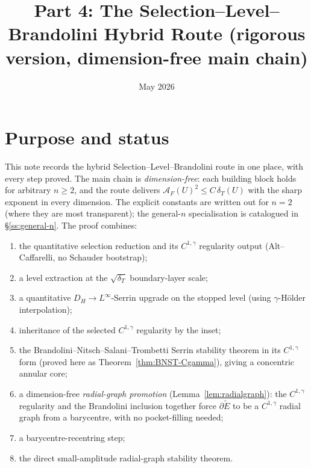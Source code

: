\documentclass[11pt]{amsart}
\title{Part 4: The Selection--Level--Brandolini Hybrid Route
       (rigorous version, dimension-free main chain)}
\author{}
\date{May 2026}
\newcommand{\dT}{\delta_T}
\newcommand{\AF}{\mathcal A_F}
\newcommand{\Etil}{\widetilde E}
\begin{document}
\maketitle

\section{Purpose and status}

This note records the hybrid Selection--Level--Brandolini route in
one place, with every step proved.  The main chain is
\emph{dimension-free}: each building block holds for arbitrary
$n\ge 2$, and the route delivers
$\AF(U)^{2}\le C\,\dT(U)$ with the sharp exponent in every
dimension.  The explicit constants are written out for $n=2$ (where
they are most transparent); the general-$n$ specialisation is
catalogued in \S\ref{ss:general-n}.  The proof combines:

\begin{enumerate}[label=\arabic*.]
\item the quantitative selection reduction and its $C^{1,\gamma}$
regularity output (Alt--Caffarelli, no Schauder bootstrap);
\item a level extraction at the $\sqrt{\dT}$ boundary-layer scale;
\item a quantitative $D_H\to L^\infty$-Serrin upgrade on the stopped
level (using $\gamma$-Hölder interpolation);
\item inheritance of the selected $C^{1,\gamma}$ regularity by the
inset;
\item the Brandolini--Nitsch--Salani--Trombetti Serrin stability
theorem in its $C^{1,\gamma}$ form (proved here as
Theorem~\ref{thm:BNST-Cgamma}), giving a concentric annular core;
\item a dimension-free \emph{radial-graph promotion}
(Lemma~\ref{lem:radialgraph}): the $C^{1,\gamma}$ regularity and the
Brandolini inclusion together force $\partial\Etil$ to be a
$C^{1,\gamma}$ radial graph from a barycentre, with no pocket-filling
needed;
\item a barycentre-recentring step;
\item the direct small-amplitude radial-graph stability theorem.
\end{enumerate}
\end{document}
